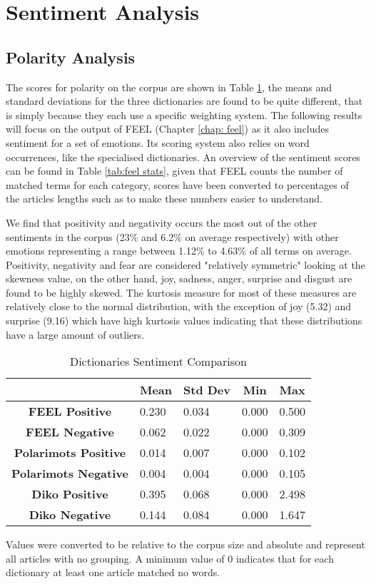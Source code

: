 \section{Sentiment Analysis}

\subsection{Polarity Analysis}

The scores for polarity on the corpus are shown in Table \ref{tab:dict stats}, the means and standard deviations for the three dictionaries are found to be quite different, that is simply because they each use a specific weighting system. The following results will focus on the output of FEEL (Chapter \ref{chap: feel}) as it also includes sentiment for a set of emotions. Its scoring system also relies on word occurrences, like the specialised dictionaries. An overview of the sentiment scores can be found in Table \ref{tab:feel stats}, given that FEEL counts the number of matched terms for each category, scores have been converted to percentages of the articles lengths such as to make these numbers easier to understand. 

We find that positivity and negativity occurs the most out of the other sentiments in the corpus (23\% and 6.2\% on average respectively) with other emotions representing a range between 1.12\% to 4.63\% of all terms on average. Positivity, negativity and fear are considered "relatively symmetric" looking at the skewness value, on the other hand, joy, sadness, anger, surprise and disgust are found to be highly skewed. The kurtosis measure for most of these measures are relatively close to the normal distribution, with the exception of joy (5.32) and surprise (9.16) which have high kurtosis values indicating that these distributions have a large amount of outliers.

\begin{table}[H]
\centering
\begin{tabular}{@{}cllll@{}}
\toprule
 & \multicolumn{1}{c}{\textbf{Mean}} & \multicolumn{1}{c}{\textbf{Std Dev}} & \multicolumn{1}{c}{\textbf{Min}} & \multicolumn{1}{c}{\textbf{Max}} \\ \midrule
\textbf{FEEL Positive} & 0.230 & 0.034 & 0.000 & 0.500 \\
\textbf{FEEL Negative} & 0.062 & 0.022 & 0.000 & 0.309 \\
\textbf{Polarimots Positive} & 0.014 & 0.007 & 0.000 & 0.102 \\
\textbf{Polarimots Negative} & 0.004 & 0.004 & 0.000 & 0.105 \\
\textbf{Diko Positive} & 0.395 & 0.068 & 0.000 & 2.498 \\
\textbf{Diko Negative} & 0.144 & 0.084 & 0.000 & 1.647 \\ \bottomrule
\end{tabular}
\caption{Dictionaries Sentiment Comparison}
Values were converted to be relative to the corpus size and absolute and represent all articles with no grouping. A minimum value of 0 indicates that for each dictionary at least one article matched no words.
\label{tab:dict stats}
\end{table}

